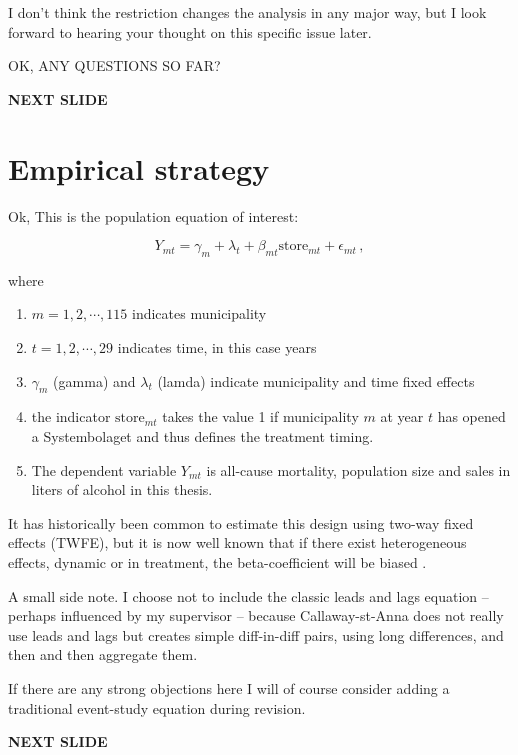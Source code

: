 \documentclass[12pt]{article}
\begin{document}
I don't think the restriction changes the analysis in any major way, but I look forward to hearing your thought on this specific issue later.


OK, ANY QUESTIONS SO FAR?

 \textbf{NEXT SLIDE}

 \section{Empirical strategy}

 Ok, This is the population equation of interest:

\begin{equation}
    Y_{mt} = \gamma_m + \lambda_t + \beta_{mt}  \text{store}_{mt} + \epsilon_{mt}\, ,
    \label{eq:pop-eq-of-interest}
\end{equation}

where 
\begin{enumerate}
    \item $m = 1,2,\cdots, 115$ indicates municipality
    \item $t = 1,2, \cdots, 29$ indicates time, in this case years
    \item $\gamma_m$ (gamma) and $\lambda_t$ (lamda) indicate municipality and time fixed effects
    \item the indicator $\text{store}_{mt}$ takes the value 1 if municipality $m$ at year $t$ has opened a Systembolaget and thus defines the treatment timing.
    \item The dependent variable $Y_{mt}$ is all-cause mortality, population size and sales in liters of alcohol in this thesis.
\end{enumerate}


It has historically been common to estimate this design using two-way fixed effects (TWFE), but it is now well known that if there exist heterogeneous effects, dynamic or in treatment, the beta-coefficient will be biased \parencite{roth2023a}.

A small side note. I choose not to include the classic leads and lags equation -- perhaps influenced by my supervisor -- because Callaway-st-Anna does not really use leads and lags but creates simple diff-in-diff pairs, using long differences, and then and then aggregate them. 

If there are any strong objections here I will of course consider adding a traditional event-study equation during revision. 

 \textbf{NEXT SLIDE}
\end{document}

